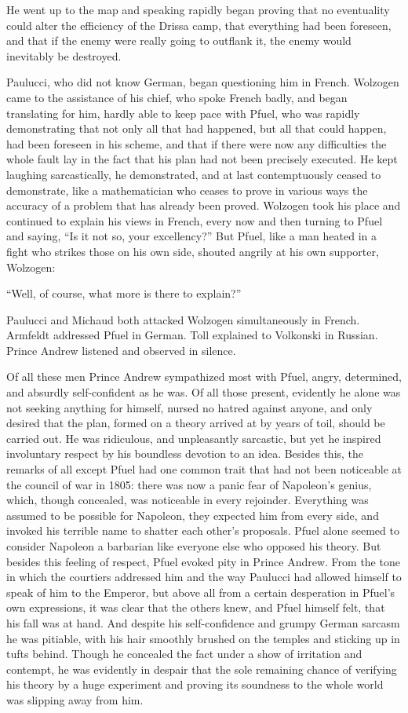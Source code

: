 He went up to the map and speaking rapidly began proving that no
eventuality could alter the efficiency of the Drissa camp, that
everything had been foreseen, and that if the enemy were really
going to outflank it, the enemy would inevitably be destroyed.

Paulucci, who did not know German, began questioning him in
French.  Wolzogen came to the assistance of his chief, who spoke
French badly, and began translating for him, hardly able to keep
pace with Pfuel, who was rapidly demonstrating that not only all
that had happened, but all that could happen, had been foreseen
in his scheme, and that if there were now any difficulties the
whole fault lay in the fact that his plan had not been precisely
executed. He kept laughing sarcastically, he demonstrated, and at
last contemptuously ceased to demonstrate, like a mathematician
who ceases to prove in various ways the accuracy of a problem
that has already been proved. Wolzogen took his place and
continued to explain his views in French, every now and then
turning to Pfuel and saying, ``Is it not so, your excellency?''
But Pfuel, like a man heated in a fight who strikes those on his
own side, shouted angrily at his own supporter, Wolzogen:

``Well, of course, what more is there to explain?''

Paulucci and Michaud both attacked Wolzogen simultaneously in
French.  Armfeldt addressed Pfuel in German. Toll explained to
Volkonski in Russian. Prince Andrew listened and observed in
silence.

Of all these men Prince Andrew sympathized most with Pfuel,
angry, determined, and absurdly self-confident as he was. Of all
those present, evidently he alone was not seeking anything for
himself, nursed no hatred against anyone, and only desired that
the plan, formed on a theory arrived at by years of toil, should
be carried out. He was ridiculous, and unpleasantly sarcastic,
but yet he inspired involuntary respect by his boundless devotion
to an idea. Besides this, the remarks of all except Pfuel had one
common trait that had not been noticeable at the council of war
in 1805: there was now a panic fear of Napoleon's genius, which,
though concealed, was noticeable in every rejoinder.  Everything
was assumed to be possible for Napoleon, they expected him from
every side, and invoked his terrible name to shatter each other's
proposals. Pfuel alone seemed to consider Napoleon a barbarian
like everyone else who opposed his theory. But besides this
feeling of respect, Pfuel evoked pity in Prince Andrew. From the
tone in which the courtiers addressed him and the way Paulucci
had allowed himself to speak of him to the Emperor, but above all
from a certain desperation in Pfuel's own expressions, it was
clear that the others knew, and Pfuel himself felt, that his fall
was at hand. And despite his self-confidence and grumpy German
sarcasm he was pitiable, with his hair smoothly brushed on the
temples and sticking up in tufts behind. Though he concealed the
fact under a show of irritation and contempt, he was evidently in
despair that the sole remaining chance of verifying his theory by
a huge experiment and proving its soundness to the whole world
was slipping away from him.

